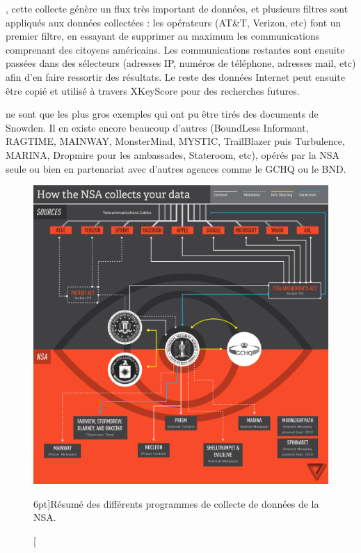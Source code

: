 , cette collecte génère un flux très important
de données, et plusieurs filtres sont appliqués aux données collectées : les
opérateurs (AT\&T, Verizon, etc) font un premier filtre, en essayant de
supprimer au maximum les communications comprenant des citoyens américains.
Les communications restantes sont ensuite passées dans des sélecteurs (adresses
IP, numéros de téléphone, adresses mail, etc) afin d'en faire ressortir des
résultats. Le reste des données Internet peut ensuite être copié et utilisé à
travers XKeyScore pour des recherches futures.


 ne sont que les plus gros exemples qui ont pu
être tirés des documents de Snowden. Il en existe encore beaucoup d'autres
(BoundLess Informant, RAGTIME, MAINWAY, MonsterMind, MYSTIC, TrailBlazer puis
Turbulence, MARINA, Dropmire pour les ambassades, Stateroom, etc), opérés par
la NSA seule ou bien en partenariat avec d'autres agences comme le GCHQ ou le
BND.

\vspace{0.8cm}
\begin{figure}
\includegraphics{flow.png}
\caption[Infographie résumant les différents programmes de
surveillance américains][6pt]{Résumé des différents programmes de collecte de
données de la NSA.}
\label{fig:infographie}
\end{figure}